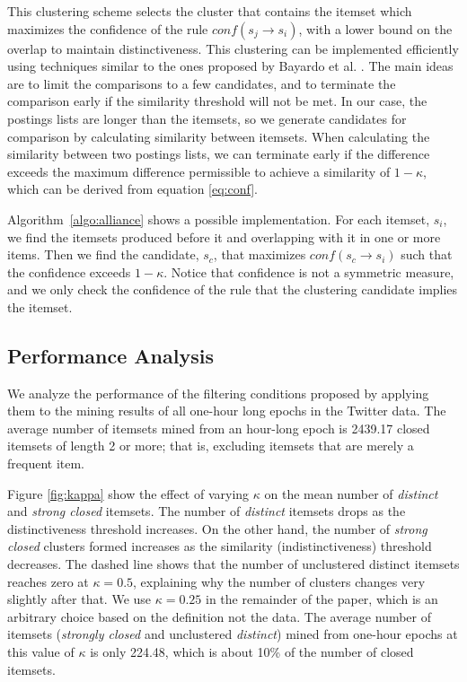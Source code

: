 \documentclass{sig-alternate}
\begin{document}
This clustering scheme selects the cluster that contains the itemset which
maximizes the confidence of the rule $conf(s_j \rightarrow s_i)$,
with a lower bound on the overlap to maintain distinctiveness. 
This clustering can be implemented efficiently using techniques similar to
the ones proposed by Bayardo et al. \cite{bayardo2007scaling}.
The main ideas are to limit the comparisons to a few candidates,
and to terminate the comparison early if the similarity threshold will not
be met.
In our case, the postings lists are longer than the itemsets,
so we generate candidates for comparison by calculating similarity between
itemsets.
When calculating the similarity between two postings lists,
we can terminate early if the difference exceeds the maximum difference
permissible to achieve a similarity of $1-\kappa$,
which can be derived from equation \ref{eq:conf}. 

Algorithm~\ref{algo:alliance}  shows a possible implementation.
For each itemset, $s_i$, we find the itemsets produced before it
and overlapping with it in one or more items.
Then we find the candidate, $s_c$, that maximizes
$conf(s_c \rightarrow s_i)$ such that the confidence exceeds $1-\kappa$.
Notice that confidence is not a symmetric measure,
and we only check the confidence of the rule that the clustering candidate
implies the itemset. 



\subsection{Performance Analysis}
\label{sec:bounding}
We analyze the performance of the filtering conditions proposed by applying
them to the mining results of all one-hour long epochs in the Twitter data.
The average number of itemsets mined from an hour-long epoch is
2439.17 closed itemsets of length 2 or more;
that is, excluding itemsets that are merely a frequent item.


Figure \ref{fig:kappa} show the effect of varying $\kappa$ on the mean number
of \emph{distinct} and \emph{strong closed} itemsets.
The number of \emph{distinct} itemsets drops as the distinctiveness threshold
increases.
On the other hand, the number of \emph{strong closed} clusters formed increases
as the similarity (indistinctiveness) threshold decreases.
The dashed line shows that the number of unclustered distinct itemsets reaches
zero at $\kappa=0.5$, explaining why the number of clusters changes very
slightly after that. 
We use $\kappa = 0.25$ in the remainder of the paper,
which is an arbitrary choice based on the definition not the data.
The average number of itemsets (\emph{strongly closed} and unclustered
\emph{distinct}) mined from one-hour epochs at this value of
$\kappa$ is only 224.48, which is about 10\% of the number of closed itemsets.
\end{document}
